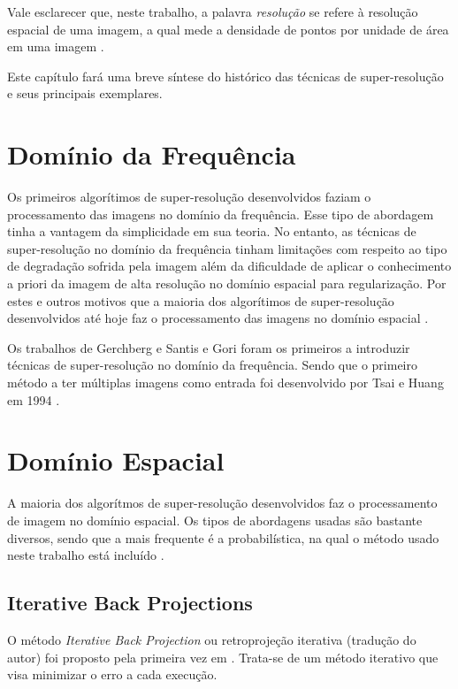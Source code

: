 \documentclass[12pt,openright,oneside,a4paper,english,brazil]{abntex2}
\begin{document}
Vale esclarecer que, neste trabalho, a palavra \textit{resolução} se refere à resolução espacial de uma imagem, a qual mede a densidade de pontos por unidade de área em uma imagem \cite{zibetti2007super}.

Este capítulo fará uma breve síntese do histórico das técnicas de super-resolução e seus principais exemplares.


\section{Domínio da Frequência}

Os primeiros algorítimos de super-resolução desenvolvidos faziam o processamento das imagens no domínio da frequência.
Esse tipo de abordagem tinha a vantagem da simplicidade em sua teoria.
No entanto, as técnicas de super-resolução no domínio da frequência tinham limitações com respeito ao tipo de degradação sofrida pela imagem além da dificuldade de aplicar o conhecimento a priori da imagem de alta resolução no domínio espacial para regularização.
Por estes e outros motivos que a maioria dos algorítimos de super-resolução desenvolvidos até hoje faz o processamento das imagens no domínio espacial \cite{park2003super}.

Os trabalhos de Gerchberg \cite{Gerchberg1974} e Santis e Gori \cite{de1975iterative} foram os primeiros a introduzir técnicas de super-resolução no domínio da frequência.
Sendo que o primeiro método a ter múltiplas imagens como entrada foi desenvolvido por Tsai e Huang em 1994 \cite{nasrollahi2014super}.



\section{Domínio Espacial}
A maioria dos algorítmos de super-resolução desenvolvidos faz o processamento de imagem no domínio espacial.
Os tipos de abordagens usadas são bastante diversos, sendo que a mais frequente é a probabilística, na qual o método usado neste trabalho está incluído \cite{nasrollahi2014super}.

\subsection{Iterative Back Projections}
O método \textit{Iterative Back Projection} ou retroprojeção iterativa (tradução do autor) foi proposto pela primeira vez em \cite{irani1991improv}.
Trata-se de um método iterativo que visa minimizar o erro a cada execução.
\end{document}
